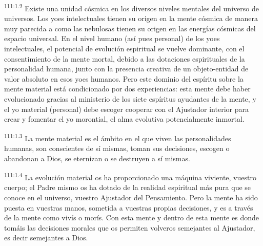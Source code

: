 \documentclass[twoside, 11pt]{book}
\begin{document}
\par
\textsuperscript{111:1.2} Existe una unidad cósmica en los diversos niveles mentales del universo de universos. Los yoes intelectuales tienen su origen en la mente cósmica de manera muy parecida a como las nebulosas tienen su origen en las energías cósmicas del espacio universal. En el nivel humano (así pues personal) de los yoes intelectuales, el potencial de evolución espiritual se vuelve dominante, con el consentimiento de la mente mortal, debido a las dotaciones espirituales de la personalidad humana, junto con la presencia creativa de un objeto-entidad de valor absoluto en esos yoes humanos. Pero este dominio del espíritu sobre la mente material está condicionado por dos experiencias: esta mente debe haber evolucionado gracias al ministerio de los siete espíritus ayudantes de la mente, y el yo material (personal) debe escoger cooperar con el Ajustador interior para crear y fomentar el yo morontial, el alma evolutiva potencialmente inmortal.

\par
\textsuperscript{111:1.3} La mente material es el ámbito en el que viven las personalidades humanas, son conscientes de sí mismas, toman sus decisiones, escogen o abandonan a Dios, se eternizan o se destruyen a sí mismas.

\par
\textsuperscript{111:1.4} La evolución material os ha proporcionado una máquina viviente, vuestro cuerpo; el Padre mismo os ha dotado de la realidad espiritual más pura que se conoce en el universo, vuestro Ajustador del Pensamiento. Pero la mente ha sido puesta en vuestras manos, sometida a vuestras propias decisiones, y es a través de la mente como vivís o morís. Con esta mente y dentro de esta mente es donde tomáis las decisiones morales que os permiten volveros semejantes al Ajustador, es decir semejantes a Dios.
\end{document}

